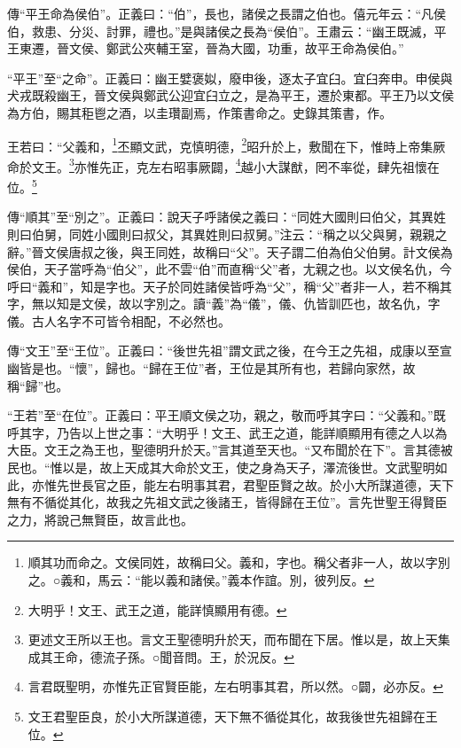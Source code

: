 {\noindent\zhuan{}\fzbyks 傳“平王命為侯伯”。正義曰：“伯”，長也，諸侯之長謂之伯也。僖元年云：“凡侯伯，救患、分災、討罪，禮也。”是與諸侯之長為“侯伯”。王肅云：“幽王既滅，平王東遷，晉文侯、鄭武公夾輔王室，晉為大國，功重，故平王命為侯伯。” \par}

{\noindent\shu{}\fzkt “平王”至“之命”。正義曰：幽王嬖褒姒，廢申後，逐太子宜臼。宜臼奔申。申侯與犬戎既殺幽王，晉文侯與鄭武公迎宜臼立之，是為平王，遷於東都。平王乃以文侯為方伯，賜其秬鬯之酒，以圭瓚副焉，作策書命之。史錄其策書，作。 \par}

王若曰：“父義和，\footnote{順其功而命之。文侯同姓，故稱曰父。義和，字也。稱父者非一人，故以字別之。○義和，馬云：“能以義和諸侯。”義本作誼。別，彼列反。}丕顯文武，克慎明德，\footnote{大明乎！文王、武王之道，能詳慎顯用有德。}昭升於上，敷聞在下，惟時上帝集厥命於文王。\footnote{更述文王所以王也。言文王聖德明升於天，而布聞在下居。惟以是，故上天集成其王命，德流子孫。○聞音問。王，於況反。}亦惟先正，克左右昭事厥闢，\footnote{言君既聖明，亦惟先正官賢臣能，左右明事其君，所以然。○闢，必亦反。}越小大謀猷，罔不率從，肆先祖懷在位。\footnote{文王君聖臣良，於小大所謀道德，天下無不循從其化，故我後世先祖歸在王位。}


{\noindent\zhuan{}\fzbyks 傳“順其”至“別之”。正義曰：說天子呼諸侯之義曰：“同姓大國則曰伯父，其異姓則曰伯舅，同姓小國則曰叔父，其異姓則曰叔舅。”注云：“稱之以父與舅，親親之辭。”晉文侯唐叔之後，與王同姓，故稱曰“父”。天子謂二伯為伯父伯舅。計文侯為侯伯，天子當呼為“伯父”，此不雲“伯”而直稱“父”者，尢親之也。以文侯名仇，今呼曰“義和”，知是字也。天子於同姓諸侯皆呼為“父”，稱“父”者非一人，若不稱其字，無以知是文侯，故以字別之。讀“義”為“儀”，儀、仇皆訓匹也，故名仇，字儀。古人名字不可皆令相配，不必然也。 \par}

{\noindent\zhuan{}\fzbyks 傳“文王”至“王位”。正義曰：“後世先祖”謂文武之後，在今王之先祖，成康以至宣幽皆是也。“懷”，歸也。“歸在王位”者，王位是其所有也，若歸向家然，故稱“歸”也。 \par}

{\noindent\shu{}\fzkt “王若”至“在位”。正義曰：平王順文侯之功，親之，敬而呼其字曰：“父義和。”既呼其字，乃告以上世之事：“大明乎！文王、武王之道，能詳順顯用有德之人以為大臣。文王之為王也，聖德明升於天。”言其道至天也。“又布聞於在下”。言其德被民也。“惟以是，故上天成其大命於文王，使之身為天子，澤流後世。文武聖明如此，亦惟先世長官之臣，能左右明事其君，君聖臣賢之故。於小大所謀道德，天下無有不循從其化，故我之先祖文武之後諸王，皆得歸在王位”。言先世聖王得賢臣之力，將說己無賢臣，故言此也。 \par}

